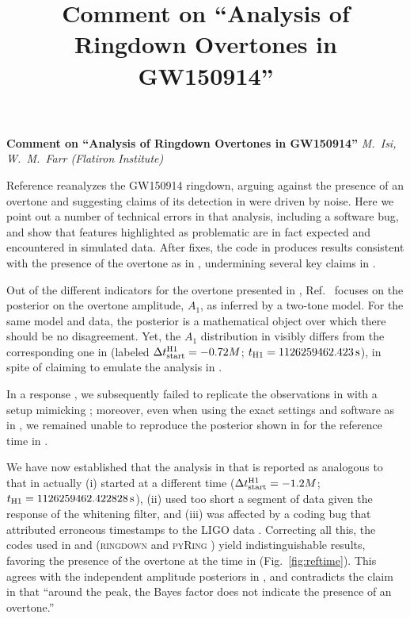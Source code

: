 \documentclass[aps,prd,twocolumn,superscriptaddress,preprintnumbers,floatfix,nofootinbib]{revtex4-2}
\begin{document}
\title{Comment on ``Analysis of Ringdown Overtones in GW150914''}

\textbf{Comment on ``Analysis of Ringdown Overtones in GW150914''}
\emph{M.~Isi, W.~M.~Farr (Flatiron Institute)}

Reference \cite{Cotesta:2022pci} reanalyzes the GW150914 ringdown, arguing against the presence of an overtone and suggesting claims of its detection in \cite{Isi:2019aib} were driven by noise.
Here we point out a number of technical errors in that analysis, including a software bug, and show that features
highlighted as problematic are in fact expected and encountered in simulated data.
After fixes, the code in \cite{Cotesta:2022pci} produces results consistent with the presence of the overtone as in \cite{Isi:2019aib,Isi:2022mhy,Finch:2022ynt}, undermining several key claims in \cite{Cotesta:2022pci}.

Out of the different indicators for the overtone presented in
\cite{Isi:2019aib}, Ref.~\cite{Cotesta:2022pci} focuses on the posterior on the
overtone amplitude, $A_1$, as inferred by a two-tone model. For the
same model and data, the posterior is a mathematical object over which there
should be no disagreement. Yet, the $A_1$ distribution in \cite{Isi:2019aib}
visibly differs from the corresponding one in \cite{Cotesta:2022pci} (labeled $\Delta
t_{\rm start}^{\rm H1} = -0.72M$; $t_{\rm H1} = 1126259462.423 \, \mathrm{s}$), in
spite of \cite{Cotesta:2022pci} claiming to emulate the analysis in
\cite{Isi:2019aib}.

In a response \cite{Isi:2022mhy}, we subsequently failed to replicate the observations in \cite{Cotesta:2022pci} with a setup mimicking \cite{Isi:2019aib}; moreover, even when using the exact settings and software as in \cite{Cotesta:2022pci}, we remained unable to reproduce the posterior shown in \cite{Cotesta:2022pci} for the reference time in \cite{Isi:2019aib}.

We have now established that the analysis in \cite{Cotesta:2022pci} that is reported as
analogous to that in \cite{Isi:2019aib} actually
(i) started at a different time ($\Delta t_{\rm start}^{\rm H1} = -1.2 M$; $t_{\rm H1} = 1126259462.422828 \, \mathrm{s}$),
(ii) used too short a segment of data given the response of the whitening filter, and
(iii) was affected by a coding bug that attributed erroneous timestamps to the LIGO data \cite{bug}.
Correcting all this, the codes used in
\cite{Isi:2022mhy} and \cite{Cotesta:2022pci} (\textsc{ringdown} \cite{ringdown}
and \textsc{pyRing} \cite{pyRing_soft}) yield indistinguishable
results, favoring the presence of the overtone at the time in \cite{Isi:2019aib}
(Fig.~\ref{fig:reftime}). This agrees with the independent amplitude
posteriors in \cite{Finch:2022ynt}, and contradicts the claim in
\cite{Cotesta:2022pci} that ``around the peak, the Bayes factor does not
indicate the presence of an overtone.''
\end{document}
